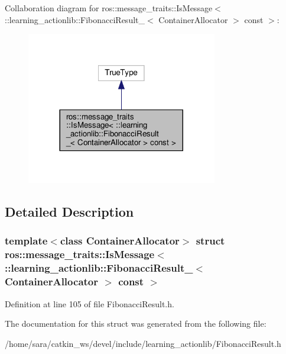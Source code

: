 Collaboration diagram for ros\+:\+:message\+\_\+traits\+:\+:Is\+Message$<$ \+:\+:learning\+\_\+actionlib\+:\+:Fibonacci\+Result\+\_\+$<$ Container\+Allocator $>$ const $>$\+:
\nopagebreak
\begin{figure}[H]
\begin{center}
\leavevmode
\includegraphics[width=236pt]{structros_1_1message__traits_1_1IsMessage_3_01_1_1learning__actionlib_1_1FibonacciResult___3_01C7ffb9cfd310aad8e0c4bd250b85cebfb}
\end{center}
\end{figure}


\subsection{Detailed Description}
\subsubsection*{template$<$class Container\+Allocator$>$\newline
struct ros\+::message\+\_\+traits\+::\+Is\+Message$<$ \+::learning\+\_\+actionlib\+::\+Fibonacci\+Result\+\_\+$<$ Container\+Allocator $>$ const $>$}



Definition at line 105 of file Fibonacci\+Result.\+h.



The documentation for this struct was generated from the following file\+:\begin{DoxyCompactItemize}
\item 
/home/sara/catkin\+\_\+ws/devel/include/learning\+\_\+actionlib/Fibonacci\+Result.\+h\end{DoxyCompactItemize}
